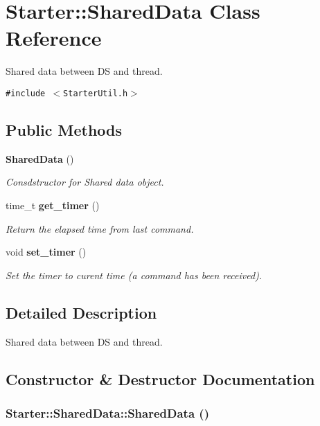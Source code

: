 \section{Starter::Shared\-Data  Class Reference}
\label{classStarter_1_1SharedData}
Shared data between DS and thread. 


{\tt \#include $<$Starter\-Util.h$>$}

\subsection*{Public Methods}
\begin{CompactItemize}
\item 
{\bf Shared\-Data} ()
\begin{CompactList}\small\item\em Consdstructor for Shared data object.\item\end{CompactList}\item 
time\_\-t {\bf get\_\-timer} ()
\begin{CompactList}\small\item\em Return the elapsed time from last command.\item\end{CompactList}\item 
void {\bf set\_\-timer} ()
\begin{CompactList}\small\item\em Set the timer to curent time (a command has been received).\item\end{CompactList}\end{CompactItemize}


\subsection{Detailed Description}
Shared data between DS and thread.



\subsection{Constructor \& Destructor Documentation}
\subsubsection{\setlength{\rightskip}{0pt plus 5cm}Starter::Shared\-Data::Shared\-Data ()}\label{classStarter_1_1SharedData_a0}


